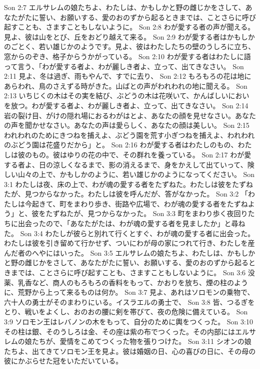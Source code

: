 Son 2:7  エルサレムの娘たちよ、わたしは、かもしかと野の雌じかをさして、あなたがたに誓い、お願いする、愛のおのずから起るときまでは、ことさらに呼び起すことも、さますこともしないように。
Son 2:8  わが愛する者の声が聞える。見よ、彼は山をとび、丘をおどり越えて来る。
Son 2:9  わが愛する者はかもしかのごとく、若い雄じかのようです。見よ、彼はわたしたちの壁のうしろに立ち、窓からのぞき、格子からうかがっている。
Son 2:10  わが愛する者はわたしに語って言う、「わが愛する者よ、わが麗しき者よ、立って、出てきなさい。
Son 2:11  見よ、冬は過ぎ、雨もやんで、すでに去り、
Son 2:12  もろもろの花は地にあらわれ、鳥のさえずる時がきた。山ばとの声がわれわれの地に聞える。
Son 2:13  いちじくの木はその実を結び、ぶどうの木は花咲いて、かんばしいにおいを放つ。わが愛する者よ、わが麗しき者よ、立って、出てきなさい。
Son 2:14  岩の裂け目、がけの隠れ場におるわがはとよ、あなたの顔を見せなさい。あなたの声を聞かせなさい。あなたの声は愛らしく、あなたの顔は美しい。
Son 2:15  われわれのためにきつねを捕えよ、ぶどう園を荒す小ぎつねを捕えよ、われわれのぶどう園は花盛りだから」と。
Son 2:16  わが愛する者はわたしのもの、わたしは彼のもの。彼はゆりの花の中で、その群れを養っている。
Son 2:17  わが愛する者よ、日の涼しくなるまで、影の消えるまで、身をかえして出ていって、険しい山々の上で、かもしかのように、若い雄じかのようになってください。
Son 3:1  わたしは夜、床の上で、わが魂の愛する者をたずねた。わたしは彼をたずねたが、見つからなかった。わたしは彼を呼んだが、答がなかった。
Son 3:2  「わたしは今起きて、町をまわり歩き、街路や広場で、わが魂の愛する者をたずねよう」と、彼をたずねたが、見つからなかった。
Son 3:3  町をまわり歩く夜回りたちに出会ったので、「あなたがたは、わが魂の愛する者を見ましたか」と尋ねた。
Son 3:4  わたしが彼らと別れて行くとすぐ、わが魂の愛する者に出会った。わたしは彼を引き留めて行かせず、ついにわが母の家につれて行き、わたしを産んだ者のへやにはいった。
Son 3:5  エルサレムの娘たちよ、わたしは、かもしかと野の雌じかをさして、あなたがたに誓い、お願いする、愛のおのずから起るときまでは、ことさらに呼び起すことも、さますこともしないように。
Son 3:6  没薬、乳香など、商人のもろもろの香料をもって、かおりを放ち、煙の柱のように、荒野から上って来るものは何か。
Son 3:7  見よ、あれはソロモンの乗物で、六十人の勇士がそのまわりにいる。イスラエルの勇士で、
Son 3:8  皆、つるぎをとり、戦いをよくし、おのおの腰に剣を帯びて、夜の危険に備えている。
Son 3:9  ソロモン王はレバノンの木をもって、自分のために輿をつくった。
Son 3:10  その柱は銀、そのうしろは金、その座は紫の布でつくった。その内部にはエルサレムの娘たちが、愛情をこめてつくった物を張りつけた。
Son 3:11  シオンの娘たちよ、出てきてソロモン王を見よ。彼は婚姻の日、心の喜びの日に、その母の彼にかぶらせた冠をいただいている。
